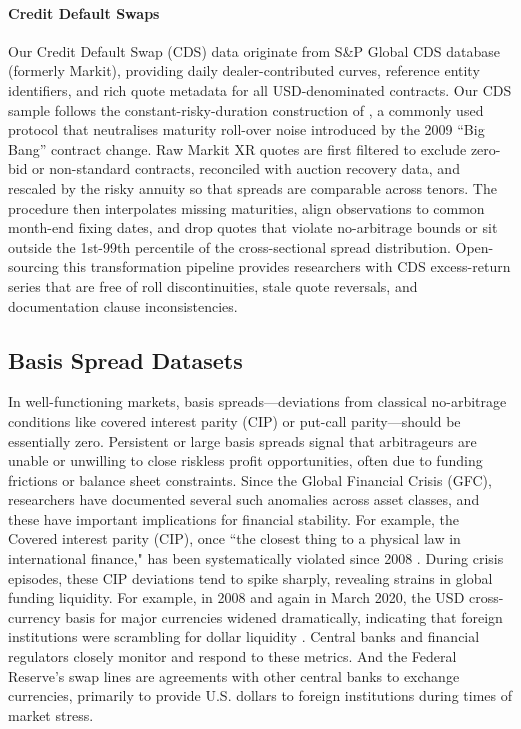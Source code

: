 \documentclass{article}
\begin{document}
\paragraph{Credit Default Swaps}
Our Credit Default Swap (CDS) data originate from S\&P Global CDS database (formerly Markit), 
providing daily dealer-contributed curves, reference entity identifiers,
and rich quote metadata for all USD-denominated contracts. 
Our CDS sample follows the constant-risky-duration construction of
\cite{Palhares2012}, a commonly used protocol that neutralises maturity roll-over
noise introduced by the 2009 ``Big Bang'' contract change. Raw Markit XR quotes
are first filtered to exclude zero-bid or non-standard contracts, reconciled
with auction recovery data, and rescaled by the risky annuity so that spreads
are comparable across tenors.  The procedure then interpolates missing
maturities, align observations to common month-end fixing dates, and drop quotes
that violate no-arbitrage bounds or sit outside the 1st-99th percentile of the
cross-sectional spread distribution. Open-sourcing this transformation pipeline
provides researchers with CDS excess-return series that are free of roll
discontinuities, stale quote reversals, and documentation clause
inconsistencies.

\subsection{Basis Spread Datasets}

In well-functioning markets, basis spreads---deviations from classical no-arbitrage conditions like covered interest parity (CIP) or put-call parity---should be essentially zero. Persistent or large basis spreads signal that arbitrageurs are unable or unwilling to close riskless profit opportunities, often due to funding frictions or balance sheet constraints. Since the Global Financial Crisis (GFC), researchers have documented several such anomalies across asset classes, and these have important implications for financial stability.
For example, the Covered interest parity (CIP), once ``the closest thing to a physical law in international finance," has been systematically violated since 2008 \cite{Du2018}.
During crisis episodes, these CIP deviations tend to spike sharply, revealing strains in global funding liquidity. For example, in 2008 and again in March 2020, the USD cross-currency basis for major currencies widened dramatically, indicating that foreign institutions were scrambling for dollar liquidity 
\citep{BoardofGovernorsoftheFederalReserveSystem2020}.
Central banks and financial regulators closely monitor and respond to these metrics.
And the Federal Reserve's swap lines are agreements with other central banks to exchange currencies, primarily to provide U.S. dollars to foreign institutions during times of market stress.
\end{document}

